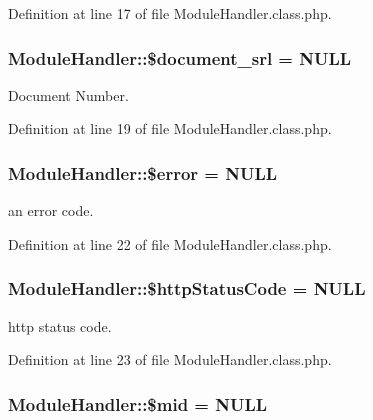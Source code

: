 Definition at line 17 of file Module\+Handler.\+class.\+php.

\hypertarget{classModuleHandler_acf9f6062042025aab6a7e10f6b261909}{
\subsubsection[{\$document\+\_\+srl}]{\setlength{\rightskip}{0pt plus 5cm}Module\+Handler\+::\$document\+\_\+srl = N\+U\+L\+L}}\label{classModuleHandler_acf9f6062042025aab6a7e10f6b261909}


Document Number. 



Definition at line 19 of file Module\+Handler.\+class.\+php.

\hypertarget{classModuleHandler_ad81b78f21e42724e73da6808c561159c}{
\subsubsection[{\$error}]{\setlength{\rightskip}{0pt plus 5cm}Module\+Handler\+::\$error = N\+U\+L\+L}}\label{classModuleHandler_ad81b78f21e42724e73da6808c561159c}


an error code. 



Definition at line 22 of file Module\+Handler.\+class.\+php.

\hypertarget{classModuleHandler_a033e864206ca6a6494af015baa5d2365}{
\subsubsection[{\$http\+Status\+Code}]{\setlength{\rightskip}{0pt plus 5cm}Module\+Handler\+::\$http\+Status\+Code = N\+U\+L\+L}}\label{classModuleHandler_a033e864206ca6a6494af015baa5d2365}


http status code. 



Definition at line 23 of file Module\+Handler.\+class.\+php.

\hypertarget{classModuleHandler_a6bb7e9e29c0fb9893d051179281b093e}{
\subsubsection[{\$mid}]{\setlength{\rightskip}{0pt plus 5cm}Module\+Handler\+::\$mid = N\+U\+L\+L}}\label{classModuleHandler_a6bb7e9e29c0fb9893d051179281b093e}


